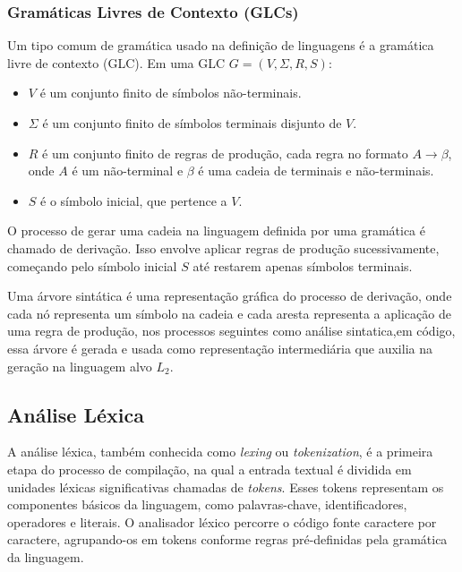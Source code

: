 \documentclass[english, 
               brazil, 
               bsc] %
               {dcomp-abntex2}
\begin{document}
\subsubsection{Gramáticas Livres de Contexto (GLCs)}

Um tipo comum de gramática usado na definição de linguagens é a gramática livre de contexto (GLC). Em uma GLC $ G=(V,\Sigma,R,S)$:

\begin{itemize}
  \item $V$ é um conjunto finito de símbolos não-terminais.

  \item $\Sigma$ é um conjunto finito de símbolos terminais disjunto de $V$.

  \item $R$ é um conjunto finito de regras de produção, cada regra no formato $A \rightarrow \beta$, onde $A$ é um não-terminal e $\beta$ é uma cadeia de terminais e não-terminais.

  \item $S$ é o símbolo inicial, que pertence a $V$.
\end{itemize}

O processo de gerar uma cadeia na linguagem definida por uma gramática é chamado de derivação. Isso envolve aplicar regras de produção sucessivamente, começando pelo símbolo inicial $S$ até restarem apenas símbolos terminais.

Uma árvore sintática é uma representação gráfica do processo de derivação, onde cada nó representa um símbolo na cadeia e cada aresta representa a aplicação de uma regra de produção, nos processos seguintes como análise sintatica,em código, essa árvore é gerada e usada como representação intermediária que auxilia na geração na linguagem alvo $L_2$.


\subsection{Análise Léxica}
A análise léxica, também conhecida como \textit{lexing} ou \textit{tokenization}, é a primeira etapa do processo de compilação, na qual a entrada textual é dividida em unidades léxicas significativas chamadas de \textit{tokens}. Esses tokens representam os componentes básicos da linguagem, como palavras-chave, identificadores, operadores e literais. O analisador léxico percorre o código fonte caractere por caractere, agrupando-os em tokens conforme regras pré-definidas pela gramática da linguagem.
\end{document}
